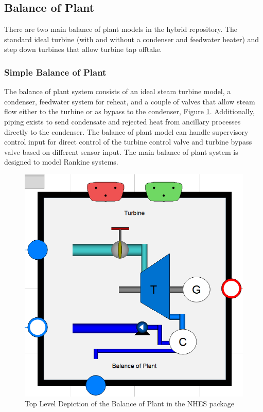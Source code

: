 \subsection{Balance of Plant}
There are two main balance of plant models in the hybrid repository. The standard ideal turbine (with and without a condenser and feedwater heater) and step down turbines that allow turbine tap offtake.


\subsubsection{Simple Balance of Plant}

The balance of plant system consists of an ideal steam turbine model, a condenser, feedwater system for reheat, and a couple of valves that allow steam flow either to the turbine or as bypass to the condenser, Figure \ref{Top View SimpleBOP}. Additionally, piping exists to send condensate and rejected heat from ancillary processes directly to the condenser. The balance of plant model can handle supervisory control input for direct control of the turbine control valve and turbine bypass valve based on different sensor input. The main balance of plant system is designed to model Rankine systems.  

\begin{figure}[hbtp]
\centering
\includegraphics[scale=0.4]{pics/BOP.png}
\caption{Top Level Depiction of the Balance of Plant in the NHES package}
\label{Top View SimpleBOP}
\end{figure}


